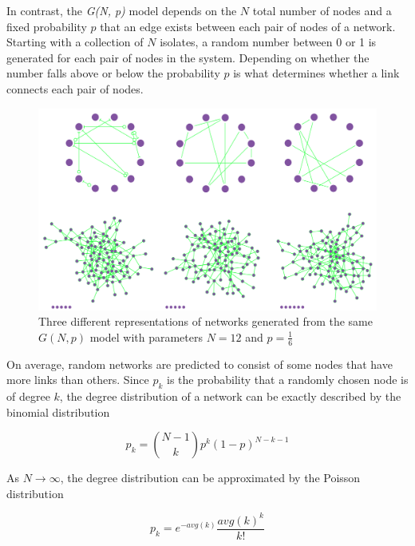 \documentclass{article}
\begin{document}
In contrast, the  \textit{G(N, p)} model depends on the $N$ total number of nodes and a fixed probability $p$ that an edge exists between each pair of nodes of a network.  Starting with a collection of $N$ isolates, a random number between 0 or 1 is generated for each  pair of nodes in the system.  Depending on whether the number falls above or below the probability $p$ is what determines whether a link connects each pair of nodes.


\begin{figure}[h]
    \center
    \includegraphics[scale=0.5]{ns-random}
    \caption{Three different representations of networks generated from the same $G(N,p)$ model with parameters $N=12$ and $p=\frac{1}{6}$  \cite{ns}}
    \label{fig:random}
\end{figure}



On average, random networks are predicted to consist of some nodes that have more links than others.  Since $p_k$ is the probability that a randomly chosen node is of degree $k$, the degree distribution of a network can be exactly described by the binomial distribution

\begin{equation}\label{eq:binomial}
    p_k = \binom{N-1}{k} p^k (1-p)^{N-k-1}
\end{equation}


As $N \rightarrow \infty$, the degree distribution can be approximated by the Poisson distribution

\begin{equation}\label{eq:poisson}
    p_k = e^{- avg(k)} \frac{avg(k)^k}{k!}
\end{equation}
\end{document}
